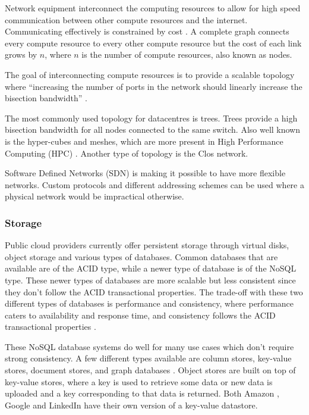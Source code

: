 \documentclass[fullapage,12pt]{article}
\begin{document}
Network equipment interconnect the computing resources to allow for high speed communication between other compute resources and the internet. Communicating effectively is constrained by cost \cite{Jennings2015}. A complete graph connects every compute resource to every other compute resource but the cost of each link grows by $n$, where $n$ is the number of compute resources, also known as nodes.

The goal of interconnecting compute resources is to provide a scalable topology where ``increasing the number of ports in the network should linearly increase the bisection bandwidth'' \cite{abts2012guided}.

The most commonly used topology for datacentres is trees. Trees provide a high bisection bandwidth for all nodes connected to the same switch. Also well known is the hyper-cubes and meshes, which are more present in High Performance Computing (HPC) \cite{Jennings2015}. Another type of topology is the Clos network. %

Software Defined Networks (SDN) is making it possible to have more flexible networks. Custom protocols and different addressing schemes can be used where a physical network would be impractical otherwise.

\subsubsection{Storage} \label{ssub:storage}


Public cloud providers currently offer persistent storage through virtual disks, object storage and various types of databases. Common databases that are available are of the ACID type, while a newer type of database is of the NoSQL type. These newer types of databases are more scalable but less consistent since they don't follow the ACID transactional properties. The trade-off with these two different types of databases is performance and consistency, where performance caters to availability and response time, and consistency follows the ACID transactional properties \cite{Jennings2015}.

These NoSQL database systems do well for many use cases which don't require strong consistency. A few different types available are column stores, key-value stores, document stores, and graph databases \cite{graphDB2013}. Object stores are built on top of key-value stores, where a key is used to retrieve some data or new data is uploaded and a key corresponding to that data is returned. Both Amazon \cite{dynamodb}, Google \cite{cassandra} and LinkedIn \cite{voldemort} have their own version of a key-value datastore.
\end{document}
